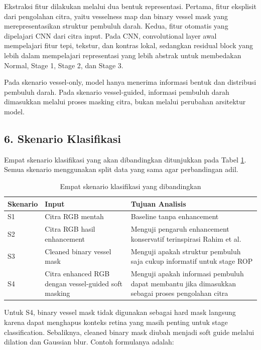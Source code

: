 \documentclass[12pt,a4paper]{article}
\begin{document}
Ekstraksi fitur dilakukan melalui dua bentuk representasi. Pertama, fitur eksplisit dari pengolahan citra, yaitu vesselness map dan binary vessel mask yang merepresentasikan struktur pembuluh darah. Kedua, fitur otomatis yang dipelajari CNN dari citra input. Pada CNN, convolutional layer awal mempelajari fitur tepi, tekstur, dan kontras lokal, sedangkan residual block yang lebih dalam mempelajari representasi yang lebih abstrak untuk membedakan Normal, Stage 1, Stage 2, dan Stage 3.

Pada skenario vessel-only, model hanya menerima informasi bentuk dan distribusi pembuluh darah. Pada skenario vessel-guided, informasi pembuluh darah dimasukkan melalui proses masking citra, bukan melalui perubahan arsitektur model.

\subsection*{6. Skenario Klasifikasi}

Empat skenario klasifikasi yang akan dibandingkan ditunjukkan pada Tabel \ref{tab:skenario}. Semua skenario menggunakan split data yang sama agar perbandingan adil.

\begin{table}[h]
\centering
\caption{Empat skenario klasifikasi yang dibandingkan}
\label{tab:skenario}
\begin{tabular}{>{\raggedright\arraybackslash}p{2cm} >{\raggedright\arraybackslash}p{5cm} >{\raggedright\arraybackslash}p{6cm}}
\toprule
\textbf{Skenario} & \textbf{Input} & \textbf{Tujuan Analisis} \\
\midrule
S1 & Citra RGB mentah & Baseline tanpa enhancement \\
S2 & Citra RGB hasil enhancement & Menguji pengaruh enhancement konservatif terinspirasi Rahim et al. \\
S3 & Cleaned binary vessel mask & Menguji apakah struktur pembuluh saja cukup informatif untuk stage ROP \\
S4 & Citra enhanced RGB dengan vessel-guided soft masking & Menguji apakah informasi pembuluh dapat membantu jika dimasukkan sebagai proses pengolahan citra \\
\bottomrule
\end{tabular}
\end{table}

Untuk S4, binary vessel mask tidak digunakan sebagai hard mask langsung karena dapat menghapus konteks retina yang masih penting untuk stage classification. Sebaliknya, cleaned binary mask diubah menjadi soft guide melalui dilation dan Gaussian blur. Contoh formulanya adalah:
\end{document}
